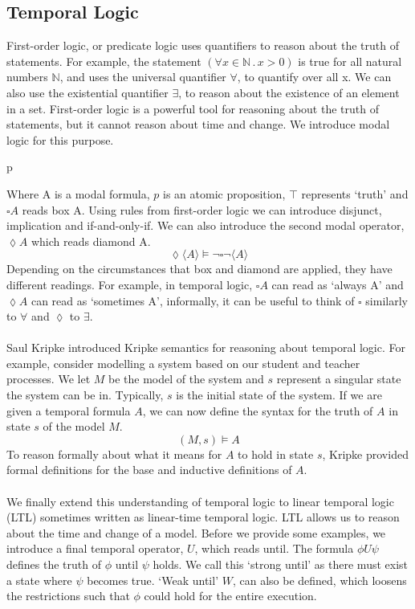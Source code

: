 \subsection{Temporal Logic}
First-order logic, or predicate logic uses quantifiers to reason about the truth of statements. For example, the statement $(\forall x \in \mathbb{N} \,.\, x > 0)$ is true for all natural numbers $\mathbb{N}$, and uses the universal quantifier $\forall$, to quantify over all x. We can also use the existential quantifier $\exists$, to reason about the existence of an element in a set. First-order logic is a powerful tool for reasoning about the truth of statements, but it cannot reason about time and change. We introduce modal logic for this purpose.
\begin{bnf*}
      {p \bnfor \top \bnfor \neg {} \bnfor {} \land {} \bnfor \square {}}\\
\end{bnf*}
Where A is a modal formula, $p$ is an atomic proposition, $\top$ represents `truth' and $\square A$ reads box A. Using rules from first-order logic we can introduce disjunct, implication and if-and-only-if. We can also introduce the second modal operator, $\lozenge A$ which reads diamond A.
\[
\lozenge \langle A \rangle \models \neg \square \neg \langle A \rangle
\]
Depending on the circumstances that box and diamond are applied, they have different readings. For example, in temporal logic, $\square A$ can read as `always A' and $\lozenge A$ can read as `sometimes A', informally, it can be useful to think of $\square$ similarly to $\forall$ and $\lozenge$ to $\exists$.
\\ \\
Saul Kripke introduced Kripke semantics \cite{kripke} for reasoning about temporal logic. For example, consider modelling a system based on our student and teacher processes. We let $M$ be the model of the system and $s$ represent a singular state the system can be in. Typically, $s$ is the initial state of the system. If we are given a temporal formula $A$, we can now define the syntax for the truth of $A$ in state $s$ of the model $M$.
\[
(M, s) \models A
\]
To reason formally about what it means for $A$ to hold in state $s$, Kripke provided formal definitions for the base and inductive definitions of $A$.
\\ \\
We finally extend this understanding of temporal logic to linear temporal logic (LTL) sometimes written as linear-time temporal logic. LTL allows us to reason about the time and change of a model. Before we provide some examples, we introduce a final temporal operator, $U$, which reads until. The formula $\phi U \psi$ defines the truth of $\phi$ until $\psi$ holds. We call this `strong until' as there must exist a state where $\psi$ becomes true. `Weak until' $W$, can also be defined, which loosens the restrictions such that $\phi$ could hold for the entire execution.
